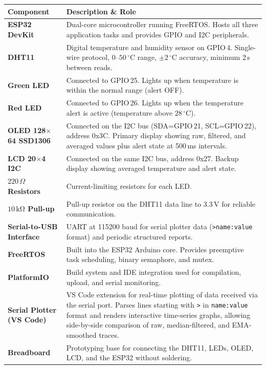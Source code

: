 \begin{center}
\begin{tabular}{| p{4cm} | p{10cm} |}
\hline
\textbf{Component} & \textbf{Description \& Role} \\ \hline
\textbf{ESP32 DevKit} & Dual-core microcontroller running FreeRTOS. Hosts all three
  application tasks and provides GPIO and I2C peripherals. \\ \hline
\textbf{DHT11} & Digital temperature and humidity sensor on GPIO\,4. Single-wire
  protocol, $0$--$50\,^\circ$C range, $\pm 2\,^\circ$C accuracy, minimum 2\,s
  between reads. \\ \hline
\textbf{Green LED} & Connected to GPIO\,25. Lights up when temperature is within the
  normal range (alert OFF). \\ \hline
\textbf{Red LED} & Connected to GPIO\,26. Lights up when the temperature alert is active
  (temperature above $28\,^\circ$C). \\ \hline
\textbf{OLED 128$\times$64 SSD1306} & Connected on the I2C bus (SDA=GPIO\,21,
  SCL=GPIO\,22), address 0x3C. Primary display showing raw, filtered, and averaged
  values plus alert state at 500\,ms intervals. \\ \hline
\textbf{LCD 20$\times$4 I2C} & Connected on the same I2C bus, address 0x27. Backup
  display showing averaged temperature and alert state. \\ \hline
\textbf{$220\,\Omega$ Resistors} & Current-limiting resistors for each LED. \\ \hline
\textbf{$10\,\mathrm{k\Omega}$ Pull-up} & Pull-up resistor on the DHT11 data line
  to 3.3\,V for reliable communication. \\ \hline
\textbf{Serial-to-USB Interface} & UART at 115200 baud for serial plotter data
  (\texttt{>name:value} format) and periodic structured reports. \\ \hline
\textbf{FreeRTOS} & Built into the ESP32 Arduino core. Provides preemptive task
  scheduling, binary semaphore, and mutex. \\ \hline
\textbf{PlatformIO} & Build system and IDE integration used for compilation, upload,
  and serial monitoring. \\ \hline
\textbf{Serial Plotter (VS Code)} & VS Code extension for real-time plotting of data
  received via the serial port. Parses lines starting with \texttt{>} in
  \texttt{name:value} format and renders interactive time-series graphs, allowing
  side-by-side comparison of raw, median-filtered, and EMA-smoothed traces. \\ \hline
\textbf{Breadboard} & Prototyping base for connecting the DHT11, LEDs, OLED, LCD,
  and the ESP32 without soldering. \\ \hline
\end{tabular}
\end{center}

